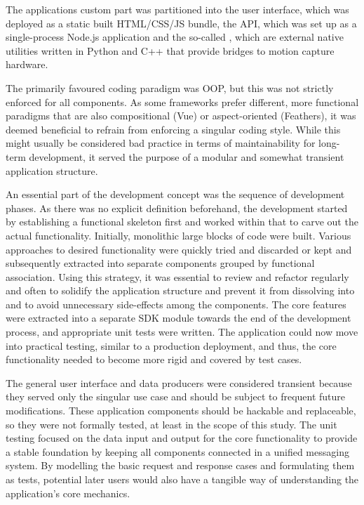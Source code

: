The application\textquotesingle s custom part was partitioned into the user interface, which was deployed as a static built \ac{HTML}/\ac{CSS}/\ac{JS} bundle, the \ac{API}, which was set up as a single-process Node.js application and the so-called , which are external native utilities written in Python and C++ that provide bridges to motion capture hardware.

The primarily favoured coding paradigm was \ac{OOP}, but this was not strictly enforced for all components.
As some frameworks prefer different, more functional paradigms that are also compositional (Vue) or aspect-oriented (Feathers), it was deemed beneficial to refrain from enforcing a singular coding style.
While this might usually be considered bad practice in terms of maintainability for long-term development, it served the purpose of a modular and somewhat transient  application structure.

An essential part of the development concept was the sequence of development phases.
As there was no explicit definition beforehand, the development started by establishing a functional skeleton first and worked within that to carve out the actual functionality.
Initially, monolithic large blocks of code were built.
Various approaches to desired functionality were quickly tried and discarded or kept and subsequently extracted into separate components grouped by functional association.
Using this strategy, it was essential to review and refactor regularly and often to solidify the application structure and prevent it from dissolving into  and to avoid unnecessary side-effects among the components.
The core features were extracted into a separate \ac{SDK} module towards the end of the development process, and appropriate unit tests were written.
The application could now move into practical testing, similar to a production deployment, and thus, the core functionality needed to become more rigid and covered by test cases.

The general user interface and data producers were considered transient because they served only the singular use case and should be subject to frequent future modifications.
These application components should be hackable and replaceable, so they were not formally tested, at least in the scope of this study.
The unit testing focused on the data input and output for the core functionality to provide a stable foundation by keeping all components connected in a unified messaging system.
By modelling the basic request and response cases and formulating them as tests, potential later users would also have a tangible way of understanding the application's core mechanics.

